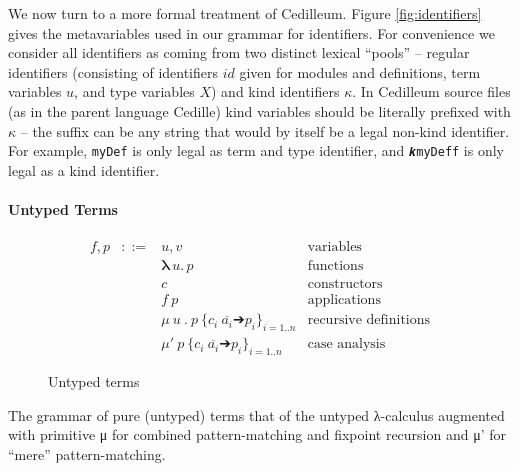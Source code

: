 \documentclass{article}
\newcommand{\absu}[3]{{#1}\, #2.\, #3}
\newcommand{\vars}[1]{{\overline{#1}}}
\newcommand{\mufix}[3]{μ\ #1\ .\ #2\ \textbf{\{} #3 \textbf{\}}}
\newcommand{\mumat}[2]{μ'\ #1\ \textbf{\{}#2\textbf{\}}}
\begin{document}
We now turn to a more formal treatment of Cedilleum. Figure
\ref{fig:identifiers} gives the metavariables used in our grammar for
identifiers. For convenience we consider all identifiers as coming from two
distinct lexical ``pools'' -- regular identifiers (consisting of identifiers
$id$ given for modules and definitions, term variables $u$, and type variables
$X$) and kind identifiers $\kappa$. In Cedilleum source files (as in the parent
language Cedille) kind variables should be literally prefixed with $\kappa$ --
the suffix can be any string that would by itself be a legal non-kind
identifier. For example, \texttt{myDef} is only legal as term and type
identifier, and \texttt{𝒌myDeff} is only legal as a kind identifier.

\paragraph{Untyped Terms}
\begin{figure}[h]
  \[
    \begin{array}{llll}
      f, p
      & ::= & u,v
      & \text{variables}
      \\ & & \absu{\textbf{λ}}{u}{p}
      & \text{functions}
      \\ & & c
      & \text{constructors}
      \\ & & f\ p
      & \text{applications}
      \\ & & \mufix{u}{p}{c_i\ \vars{a_i} ➔ p_i}_{i=1..n}
      & \text{recursive definitions}
      \\ & & \mumat{p}{c_i\ \vars{a_i} ➔ p_i}_{i=1..n}
      & \text{case analysis}
    \end{array}
  \]
  \caption{Untyped terms}
  \label{fig:pure-terms}
\end{figure}

The grammar of pure (untyped) terms that of the untyped λ-calculus augmented
with primitive μ for combined pattern-matching and fixpoint recursion and μ' for
``mere'' pattern-matching.
\end{document}
